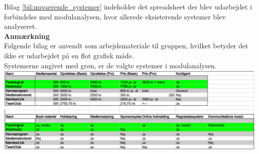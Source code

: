 \label{bil:nuvaerende_systemer}


Bilag \ref{bil:nuvaerende_systemer} indeholder det spreadsheet der blev udarbejdet i forbindelse med modulanalysen, hvor allerede eksisterende systemer blev analyseret.\\

{\bf Anmærkning} \\
Følgende bilag er anvendt som arbejdsmateriale til gruppen, hvilket betyder det ikke er udarbejdet på en flot grafisk måde.\\
Systemerne angivet med grøn, er de valgte systemer i modulanalysen.\\

\includegraphics[scale=0.5]{Kapitler/Bilag/sammenligning.png}